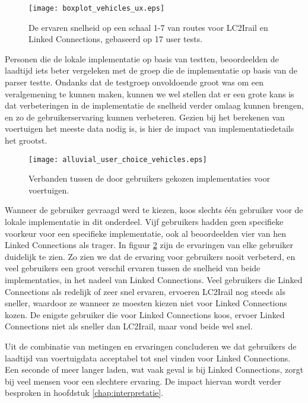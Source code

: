 \begin{figure}[h]
	\centering
	\texttt{[image: boxplot\_vehicles\_ux.eps]}
	\caption[Ervaren snelheid van routes]{De ervaren snelheid op een schaal 1-7 van routes voor LC2Irail en Linked Connections, gebaseerd op 17 user tests.}
	\label{fig:vehiclesUx}
\end{figure}

Personen die de lokale implementatie op basis van  testten, beoordeelden de laadtijd iets beter vergeleken met de groep die de implementatie op basis van de  parser testte. Ondanks dat de testgroep onvoldoende groot was om een veralgemening te kunnen maken, kunnen we wel stellen dat er een grote kans is dat verbeteringen in de implementatie de snelheid verder omlaag kunnen brengen, en zo de gebruikerservaring kunnen verbeteren. Gezien bij het berekenen van voertuigen het meeste data nodig is, is hier de impact van implementatiedetails het grootst.

\begin{figure}[ht]
	\centering
	\texttt{[image: alluvial\_user\_choice\_vehicles.eps]}
	\caption[Door gebruikers gekozen implementatie voor voertuigen]{Verbanden tussen de door gebruikers gekozen implementaties voor voertuigen. }
	\label{fig:alluvialUserChoicesVehicles}
\end{figure}

Wanneer de gebruiker gevraagd werd te kiezen, koos slechts één gebruiker voor de lokale implementatie in dit onderdeel. Vijf gebruikers hadden geen specifieke voorkeur voor een specifieke implementatie, ook al beoordeelden vier van hen Linked Connections als trager. In figuur \ref{fig:alluvialUserChoicesVehicles} zijn de ervaringen van elke gebruiker duidelijk te zien. Zo zien we dat de ervaring voor gebruikers nooit verbeterd, en veel gebruikers een groot verschil ervaren tussen de snelheid van beide implementaties, in het nadeel van Linked Connections. Veel gebruikers die Linked Connections als redelijk of zeer snel ervaren, ervoeren LC2Irail nog steeds als sneller, waardoor ze wanneer ze moesten kiezen niet voor Linked Connections kozen. De enigste gebruiker die voor Linked Connections koos, ervoer Linked Connections niet als sneller dan LC2Irail, maar vond beide wel snel.

Uit de combinatie van metingen en ervaringen concluderen we dat gebruikers de laadtijd van voertuigdata acceptabel tot snel vinden voor Linked Connections. Een seconde of meer langer laden, wat vaak geval is bij Linked Connections, zorgt bij veel mensen voor een slechtere ervaring. De impact hiervan wordt verder besproken in hoofdstuk \ref{chap:interpretatie}.

